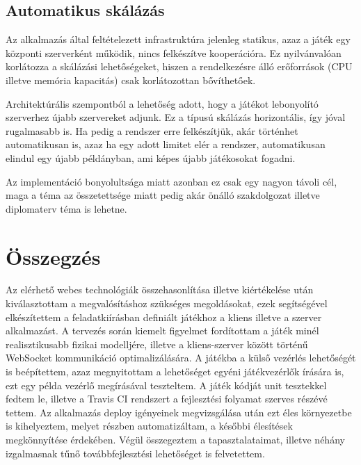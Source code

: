 \subsection{Automatikus skálázás}

Az alkalmazás által feltételezett infrastruktúra jelenleg statikus, azaz a játék
egy központi szerverként működik, nincs felkészítve kooperációra. Ez
nyilvánvalóan korlátozza a skálázási lehetőségeket, hiszen a rendelkezésre álló
erőforrások (CPU illetve memória kapacitás) csak korlátozottan bővíthetőek.

Architektúrális szempontból a lehetőség adott, hogy a játékot lebonyolító
szerverhez újabb szervereket adjunk. Ez a típusú skálázás horizontális, így
jóval rugalmasabb is. Ha pedig a rendszer erre felkészítjük, akár történhet
automatikusan is, azaz ha egy adott limitet elér a rendszer, automatikusan
elindul egy újabb példányban, ami képes újabb játékosokat fogadni.

Az implementáció bonyolultsága miatt azonban ez csak egy nagyon távoli cél, maga
a téma az összetettsége miatt pedig akár önálló szakdolgozat illetve diplomaterv
téma is lehetne.

\section{Összegzés}

Az elérhető webes technológiák összehasonlítása illetve kiértékelése után
kiválasztottam a megvalósításhoz szükséges megoldásokat, ezek segítségével
elkészítettem a feladatkiírásban definiált játékhoz a kliens illetve a szerver
alkalmazást. A tervezés során kiemelt figyelmet fordítottam a játék minél
realisztikusabb fizikai modelljére, illetve a kliens-szerver között történű
WebSocket kommunikáció optimalizálására. A játékba a külső vezérlés lehetőségét
is beépítettem, azaz megnyitottam a lehetőséget egyéni játékvezérlők írására is,
ezt egy példa vezérlő megírásával teszteltem. A játék kódját unit tesztekkel
fedtem le, illetve a Travis CI rendszert a fejlesztési folyamat szerves részévé
tettem. Az alkalmazás deploy igényeinek megvizsgálása után ezt éles környezetbe
is kihelyeztem, melyet részben automatizáltam, a későbbi élesítések
megkönnyítése érdekében. Végül összegeztem a tapasztalataimat, illetve néhány
izgalmasnak tűnő továbbfejlesztési lehetőséget is felvetettem.

